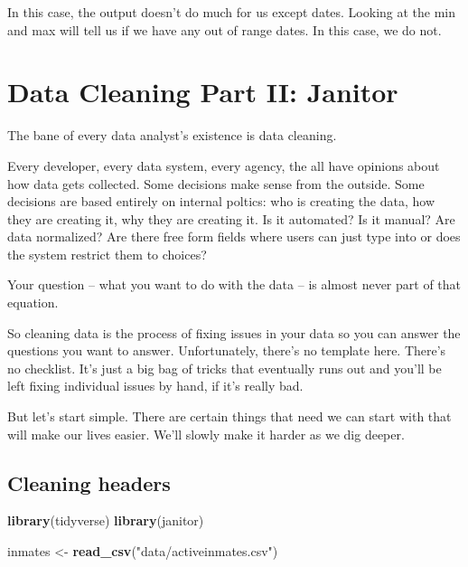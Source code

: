 \documentclass[]{book}
\newenvironment{Shaded}{\begin{snugshade}}{\end{snugshade}}
\newcommand{\KeywordTok}[1]{\textcolor[rgb]{0.13,0.29,0.53}{\textbf{#1}}}
\newcommand{\NormalTok}[1]{#1}
\newcommand{\StringTok}[1]{\textcolor[rgb]{0.31,0.60,0.02}{#1}}
\begin{document}
In this case, the output doesn't do much for us except dates. Looking at the min and max will tell us if we have any out of range dates. In this case, we do not.

\hypertarget{data-cleaning-part-ii-janitor}{%
\chapter{Data Cleaning Part II: Janitor}\label{data-cleaning-part-ii-janitor}}

The bane of every data analyst's existence is data cleaning.

Every developer, every data system, every agency, the all have opinions about how data gets collected. Some decisions make sense from the outside. Some decisions are based entirely on internal poltics: who is creating the data, how they are creating it, why they are creating it. Is it automated? Is it manual? Are data normalized? Are there free form fields where users can just type into or does the system restrict them to choices?

Your question -- what you want to do with the data -- is almost never part of that equation.

So cleaning data is the process of fixing issues in your data so you can answer the questions you want to answer. Unfortunately, there's no template here. There's no checklist. It's just a big bag of tricks that eventually runs out and you'll be left fixing individual issues by hand, if it's really bad.

But let's start simple. There are certain things that need we can start with that will make our lives easier. We'll slowly make it harder as we dig deeper.

\hypertarget{cleaning-headers}{%
\section{Cleaning headers}\label{cleaning-headers}}

\begin{Shaded}
\begin{Highlighting}[]
\KeywordTok{library}\NormalTok{(tidyverse)}
\KeywordTok{library}\NormalTok{(janitor)}
\end{Highlighting}
\end{Shaded}

\begin{Shaded}
\begin{Highlighting}[]
\NormalTok{inmates <-}\StringTok{ }\KeywordTok{read_csv}\NormalTok{(}\StringTok{"data/activeinmates.csv"}\NormalTok{)}
\end{Highlighting}
\end{Shaded}
\end{document}
